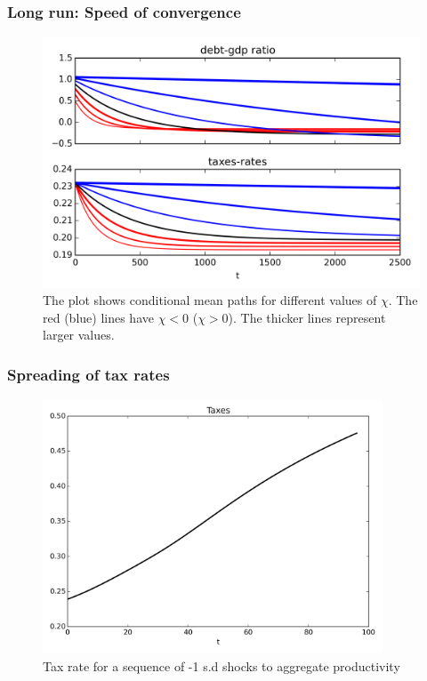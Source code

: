 \documentclass{beamer}
\begin{document}
\begin{frame}
\frametitle{Long run: Speed of convergence}
 {
  \begin{figure}
    \centering
    \includegraphics[width = 1.0\textwidth]{cesplots/speed_of_convergence.png}
    \caption{The plot shows conditional mean paths for different values of $\chi$. The red (blue) lines have $\chi<0$ ($\chi>0$). The thicker lines represent larger values.}
  \end{figure}

}

\end{frame}

\begin{frame}
 \frametitle{Spreading of tax rates}
{
  \begin{figure}
    \centering
    \includegraphics[width = 0.9\textwidth]{cesplots/taxes_only_bad_shocks.png}
    \caption{Tax rate for a sequence of -1 s.d shocks to aggregate productivity}
  \end{figure}

} 
 
\end{frame}
\end{document}
